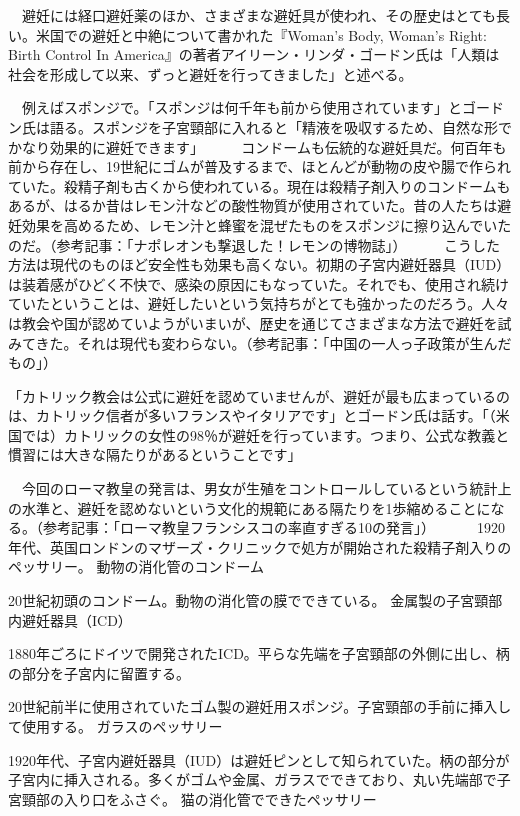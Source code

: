 　避妊には経口避妊薬のほか、さまざまな避妊具が使われ、その歴史はとても長い。米国での避妊と中絶について書かれた『Woman's Body, Woman's Right: Birth Control In America』の著者アイリーン・リンダ・ゴードン氏は「人類は社会を形成して以来、ずっと避妊を行ってきました」と述べる。

　例えばスポンジで。「スポンジは何千年も前から使用されています」とゴードン氏は語る。スポンジを子宮頸部に入れると「精液を吸収するため、自然な形でかなり効果的に避妊できます」 
　
　コンドームも伝統的な避妊具だ。何百年も前から存在し、19世紀にゴムが普及するまで、ほとんどが動物の皮や腸で作られていた。殺精子剤も古くから使われている。現在は殺精子剤入りのコンドームもあるが、はるか昔はレモン汁などの酸性物質が使用されていた。昔の人たちは避妊効果を高めるため、レモン汁と蜂蜜を混ぜたものをスポンジに擦り込んでいたのだ。（参考記事：「ナポレオンも撃退した！レモンの博物誌」） 
　
　こうした方法は現代のものほど安全性も効果も高くない。初期の子宮内避妊器具（IUD）は装着感がひどく不快で、感染の原因にもなっていた。それでも、使用され続けていたということは、避妊したいという気持ちがとても強かったのだろう。人々は教会や国が認めていようがいまいが、歴史を通じてさまざまな方法で避妊を試みてきた。それは現代も変わらない。（参考記事：「中国の一人っ子政策が生んだもの」）

「カトリック教会は公式に避妊を認めていませんが、避妊が最も広まっているのは、カトリック信者が多いフランスやイタリアです」とゴードン氏は話す。「（米国では）カトリックの女性の98％が避妊を行っています。つまり、公式な教義と慣習には大きな隔たりがあるということです」

　今回のローマ教皇の発言は、男女が生殖をコントロールしているという統計上の水準と、避妊を認めないという文化的規範にある隔たりを1歩縮めることになる。（参考記事：「ローマ教皇フランシスコの率直すぎる10の発言」） 
　
　 1920年代、英国ロンドンのマザーズ・クリニックで処方が開始された殺精子剤入りのペッサリー。
動物の消化管のコンドーム 

 20世紀初頭のコンドーム。動物の消化管の膜でできている。
金属製の子宮頸部内避妊器具（ICD） 

1880年ごろにドイツで開発されたICD。平らな先端を子宮頸部の外側に出し、柄の部分を子宮内に留置する。 

 20世紀前半に使用されていたゴム製の避妊用スポンジ。子宮頸部の手前に挿入して使用する。
ガラスのペッサリー 

 1920年代、子宮内避妊器具（IUD）は避妊ピンとして知られていた。柄の部分が子宮内に挿入される。多くがゴムや金属、ガラスでできており、丸い先端部で子宮頸部の入り口をふさぐ。
猫の消化管でできたペッサリー 

